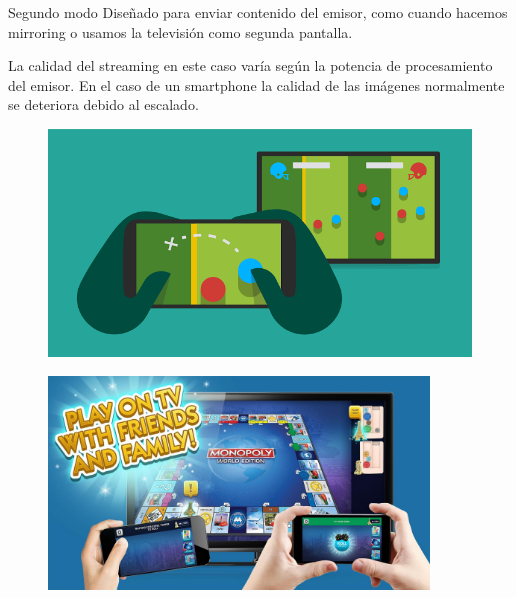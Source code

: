 \begin{frame}
	\begin{block}{Segundo modo}
		Diseñado para enviar contenido del emisor, como cuando hacemos mirroring o usamos la televisión como segunda pantalla.

		La calidad del streaming en este caso varía según la potencia de procesamiento del emisor. En el caso de un smartphone la calidad
		de las imágenes normalmente se deteriora debido al escalado.
	\end{block}

	\begin{figure}[h]
		\includegraphics[scale=0.3]{./Imagenes/seconddisplay.png}
	\end{figure}
\end{frame}

\begin{frame}
	\begin{figure}[H]
		\centering
		\includegraphics[width=0.9\textwidth]{./Imagenes/monopoly.jpg}
	\end{figure}
\end{frame}

